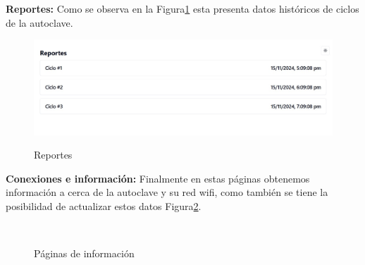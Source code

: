 \textbf{Reportes:} Como se observa en la Figura\ref{fig:rep} esta presenta datos históricos de ciclos de la autoclave.
\begin{figure}[!htb]
    \centering
    \caption{Reportes} %
    {\includegraphics[width=0.9\columnwidth]{Figuras/10.jpg}}\\
    \label{fig:rep}
\end{figure}
\newpage
\textbf{Conexiones e información:} Finalmente en estas páginas obtenemos información a cerca de la autoclave y su red \acrshort{wifi}, como también se tiene la posibilidad de actualizar estos datos Figura\ref{fig:inf}.
\begin{figure}[hpt]
    \centering
    \caption{Páginas de información}
            \qquad      %
        \\
    \label{fig:inf}
\end{figure}

